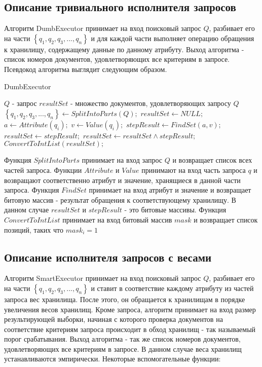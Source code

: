 \documentclass{matmex-diploma}
\begin{document}
    \subsection{Описание тривиального исполнителя запросов}
        Алгоритм DumbExecutor принимает на вход поисковый запрос $Q$, разбивает его на части $\left\{ q_1, q_2, q_3, ... , q_n \right\} $ и для каждой части выполняет операцию обращения к хранилищу, содержащему данные по данному атрибуту. Выход алгоритма - список номеров документов, удовлетворяющих все критериям в запросе. Псевдокод алгоритма выглядит следующим образом.
        \begin{algorithm}                   
        \caption{DumbExecutor}              
        \label{dumb}                        
            \begin{algorithmic}        
                \REQUIRE $Q$ - запрос
                \ENSURE $resultSet$ - множество документов, удовлетворяющих запросу $Q$
                \STATE $\left\{ q_1, q_2, q_3, ... , q_n \right\} \leftarrow SplitIntoParts(Q);$
                \STATE $resultSet \leftarrow NULL;$
                    \STATE $a \leftarrow Attribute(q_i);$
                    \STATE $v \leftarrow Value(q_i);$
                    \STATE $stepResult \leftarrow FindSet(a, v);$
                        \STATE $resultSet \leftarrow stepResult;$
                    \ENDIF
                    \STATE $resultSet \leftarrow resultSet \land stepResult;$
                \ENDFOR
                \RETURN $ConvertToIntList(resultSet);$
            \end{algorithmic}
        \end{algorithm}
        
        Функция $SplitIntoParts$ принимает на вход запрос $Q$ и возвращает список всех частей запроса. Функции $Attribute$ и $Value$ принимают на вход часть запроса $q$ и возвращают соответственно атрибут и значение, хранящиеся в данной части запроса. Функция $FindSet$ принимает на вход атрибут и значение и возвращает битовую массив - результат обращения к соответствующему хранилищу. В данном случае $resultSet $ и $stepResult$ - это битовые массивы. Функция $ConvertToIntList$ принимает на вход битовый массив $mask$ и возвращает список позиций, таких что $mask_i = 1$ 
        
    \subsection{Описание исполнителя запросов с весами}
        Алгоритм SmartExecutor принимает на вход поисковый запрос $Q$, разбивает его на части $\left\{ q_1, q_2, q_3, ... , q_n \right\} $ и ставит в соответствие каждому атрибуту из частей запроса вес хранилища. После этого, он обращается к хранилищам в порядке увеличения весов хранилищ. Кроме запроса, алгоритм принимает на вход размер результирующей выборки, начиная с которого проверка документов на соответствие критериям запроса происходит в обход хранилищ - так называемый порог срабатывания. Выход алгоритма - так же список номеров документов, удовлетворяющих все критериям в запросе. В данном случае веса хранилищ устанавливаются эмпирически. Некоторые вспомогательные функции:
        
\end{document}
